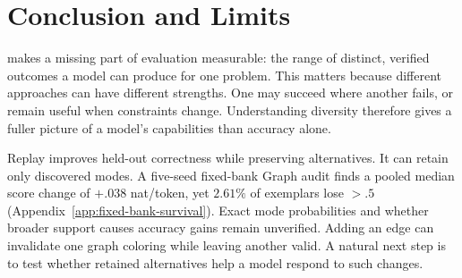\section{Conclusion and Limits}
\label{sec:conclusion}\label{sec:discussion}\label{sec:limitations}
\mb{} makes a missing part of evaluation measurable: the range of distinct,
verified outcomes a model can produce for one problem. This matters because
different approaches can have different strengths. One may succeed where
another fails, or remain useful when constraints change. Understanding diversity
therefore gives a fuller picture of a model's capabilities than accuracy alone.

Replay improves held-out correctness while preserving alternatives. It can
retain only discovered modes. A five-seed fixed-bank Graph audit finds a pooled
median score change of $+.038$ nat/token, yet $2.61\%$ of exemplars lose $>.5$
(Appendix~\ref{app:fixed-bank-survival}). Exact mode probabilities and whether
broader support causes accuracy gains remain unverified. Adding an edge can
invalidate one graph coloring while leaving another valid. A natural next step
is to test whether retained alternatives help a model respond to such changes.

\label{main:lastpage}
\clearpage


\clearpage
\appendix


